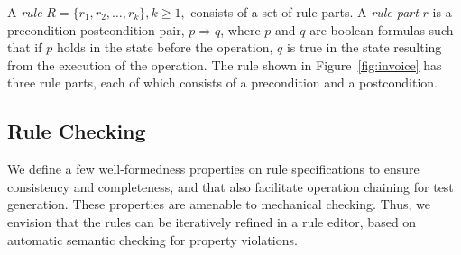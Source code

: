 A \textit{rule} $R = \{r_1, r_2, \ldots, r_k\}, k \geq 1,$ consists of a set of
rule parts. A \textit{rule part} $r$ is a precondition-postcondition pair, $p
\Longrightarrow q$, where $p$ and $q$ are boolean formulas such that if $p$
holds in the state before the operation, $q$ is true in the state resulting from
the execution of the operation.
The rule shown in Figure~\ref{fig:invoice} has three rule parts, each of which
consists of a precondition and a postcondition.




\subsection{Rule Checking}
\label{sec:checking}
 
We define a few well-formedness properties on rule specifications to ensure
consistency and completeness, and that also facilitate operation chaining for
test generation. These properties are amenable to mechanical checking. Thus, we
envision that the rules can be iteratively refined in a rule editor, based on
automatic semantic checking for property violations. %

